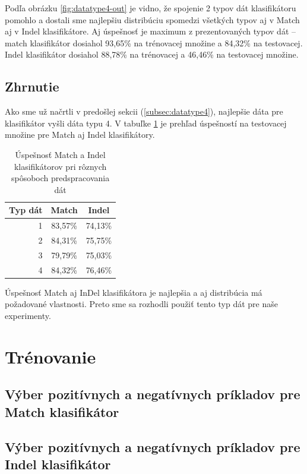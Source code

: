 Podľa obrázku \ref{fig:datatype4-out} je vidno, že spojenie 2 typov dát klasifikátoru pomohlo a dostali sme najlepšiu distribúciu spomedzi všetkých typov aj v Match aj v Indel klasifikátore.
Aj úspešnosť je maximum z prezentovaných typov dát -- match klasifikátor dosiahol 93,65\% na trénovacej množine a 84,32\% na testovacej.
Indel klasifikátor dosiahol 88,78\% na trénovacej a 46,46\% na testovacej množine.

\subsection{Zhrnutie}

Ako sme už načrtli v predošlej sekcii (\ref{subsec:datatype4}), najlepšie dáta pre klasifikátor vyšli dáta typu 4.
V tabuľke \ref{tab:datatype-all} je prehľad úspešností na testovacej množine pre Match aj Indel klasifikátory.

\begin{table}[htp]
\centering
\begin{tabular}{r|cc}
Typ dát & Match & Indel\\
\hline
1 & 83,57\% & 74,13\%\\
2 & 84,31\% & 75,75\%\\
3 & 79,79\% & 75,03\%\\
4 & 84,32\% & 76,46\%\\
\end{tabular}
\caption[Úspešnosť klasifikátorov pri rôznych typoch dát]{Úspešnosť Match a Indel klasifikátorov pri rôznych spôsoboch predspracovania dát}
\label{tab:datatype-all}
\end{table}

Úspešnosť Match aj InDel klasifikátora je najlepšia a aj distribúcia má požadované vlastnosti. Preto sme sa rozhodli použiť tento typ dát pre naše experimenty.

\section{Trénovanie}

\subsection{Výber pozitívnych a negatívnych príkladov pre Match klasifikátor}

\subsection{Výber pozitívnych a negatívnych príkladov pre Indel klasifikátor}






